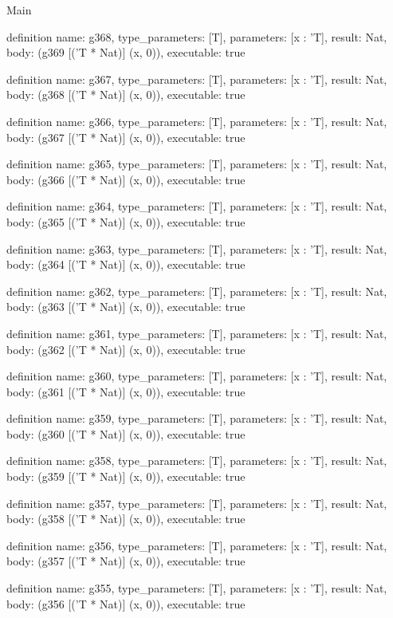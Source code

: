 \begin{lexlean}{Main}
\begin{semanticmodule}
definition{
  name: g368,
  type_parameters: [T],
  parameters: [x : 'T],
  result: Nat,
  body: (g369 [('T * Nat)] (x, 0)),
  executable: true
}

definition{
  name: g367,
  type_parameters: [T],
  parameters: [x : 'T],
  result: Nat,
  body: (g368 [('T * Nat)] (x, 0)),
  executable: true
}

definition{
  name: g366,
  type_parameters: [T],
  parameters: [x : 'T],
  result: Nat,
  body: (g367 [('T * Nat)] (x, 0)),
  executable: true
}

definition{
  name: g365,
  type_parameters: [T],
  parameters: [x : 'T],
  result: Nat,
  body: (g366 [('T * Nat)] (x, 0)),
  executable: true
}

definition{
  name: g364,
  type_parameters: [T],
  parameters: [x : 'T],
  result: Nat,
  body: (g365 [('T * Nat)] (x, 0)),
  executable: true
}

definition{
  name: g363,
  type_parameters: [T],
  parameters: [x : 'T],
  result: Nat,
  body: (g364 [('T * Nat)] (x, 0)),
  executable: true
}

definition{
  name: g362,
  type_parameters: [T],
  parameters: [x : 'T],
  result: Nat,
  body: (g363 [('T * Nat)] (x, 0)),
  executable: true
}

definition{
  name: g361,
  type_parameters: [T],
  parameters: [x : 'T],
  result: Nat,
  body: (g362 [('T * Nat)] (x, 0)),
  executable: true
}

definition{
  name: g360,
  type_parameters: [T],
  parameters: [x : 'T],
  result: Nat,
  body: (g361 [('T * Nat)] (x, 0)),
  executable: true
}

definition{
  name: g359,
  type_parameters: [T],
  parameters: [x : 'T],
  result: Nat,
  body: (g360 [('T * Nat)] (x, 0)),
  executable: true
}

definition{
  name: g358,
  type_parameters: [T],
  parameters: [x : 'T],
  result: Nat,
  body: (g359 [('T * Nat)] (x, 0)),
  executable: true
}

definition{
  name: g357,
  type_parameters: [T],
  parameters: [x : 'T],
  result: Nat,
  body: (g358 [('T * Nat)] (x, 0)),
  executable: true
}

definition{
  name: g356,
  type_parameters: [T],
  parameters: [x : 'T],
  result: Nat,
  body: (g357 [('T * Nat)] (x, 0)),
  executable: true
}

definition{
  name: g355,
  type_parameters: [T],
  parameters: [x : 'T],
  result: Nat,
  body: (g356 [('T * Nat)] (x, 0)),
  executable: true
}


\end{semanticmodule}
\end{lexlean}
